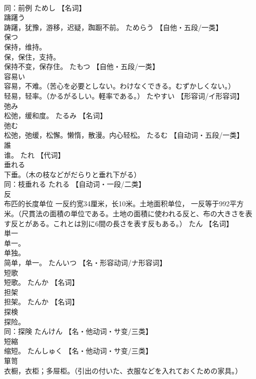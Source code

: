 \documentclass[8pt]{extreport}
\begin{document}
\begin{CJK}{UTF8}{min}
\\	同：前例	ためし		【名词】
\\	躊躇う	
\\	踌躇，犹豫，游移，迟疑，踟蹰不前。	ためらう		【自他・五段/一类】
\\	保つ	
\\	保持，维持。 
\\	保，保住，支持。 
\\	保持不变，保存住。	たもつ		【自他・五段/一类】
\\	容易い	
\\	容易，不难。（苦心を必要としない。わけなくできる。むずかしくない。） 
\\	轻易，轻率。（かるがるしい。軽率である。）	たやすい		【形容词/イ形容词】
\\	弛み	
\\	松弛，缓和度。	たるみ		【名词】
\\	弛む	
\\	松弛，弛缓，松懈。懒惰，散漫。内心轻松。	たるむ		【自动词・五段/一类】
\\	誰	
\\	谁。	たれ		【代词】
\\	垂れる	
\\	下垂。（木の枝などがだらりと垂れ下がる） 
\\	同：枝垂れる	たれる		【自动词・一段/二类】
\\	反	
\\	布匹的长度单位 一反约宽34厘米，长10米。土地面积单位， 一反等于992平方米。（尺貫法の面積の単位である。土地の面積に使われる反と、布の大きさを表す反とがある。これとは別に6間の長さを表す反もある。）	たん		【名词】
\\	単一	
\\	单一。 
\\	单独。 
\\	简单，单一。	たんいつ		【名・形容动词/ナ形容词】
\\	短歌	
\\	短歌。	たんか		【名词】
\\	担架	
\\	担架。	たんか		【名词】
\\	探検	
\\	探险。 
\\	同：探険	たんけん		【名・他动词・サ变/三类】
\\	短縮	
\\	缩短。	たんしゅく		【名・他动词・サ变/三类】
\\	箪笥	
\\	衣橱，衣柜；多屉柜。（引出の付いた、衣服などを入れておくための家具。） 

\end{CJK}
\end{document}
